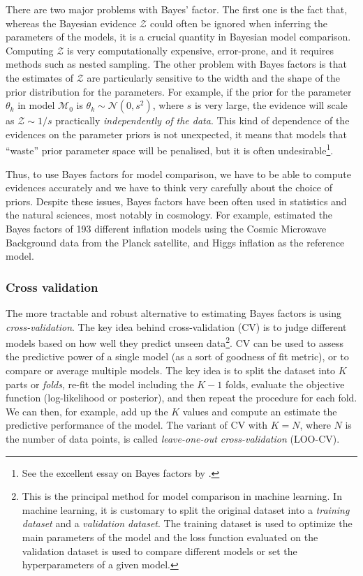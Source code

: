 \documentclass[12pt,dvipsnames]{report}
\begin{document}
There are two major problems with Bayes' factor. The first one is the fact that,
whereas the Bayesian evidence $\mathcal{Z}$ could often be ignored when inferring the 
parameters of the models, it is a crucial quantity in Bayesian model comparison. 
Computing $\mathcal{Z}$ is very computationally expensive, error-prone, and it
 requires methods such as nested sampling.
The other problem with Bayes
factors is that the estimates of $\mathcal{Z}$ are particularly sensitive to the 
width and the shape of the prior distribution for the parameters. For example, if 
the prior for the parameter $\theta_k$
in model $\mathcal{M}_0$ is $\theta_k\sim \mathcal{N}(0, s^2)$, where $s$ is
very large, the evidence will scale as $\mathcal{Z}\sim 1/s$ practically
\emph{independently of the data}. This kind of dependence of the evidences on the
parameter priors is not unexpected, it means that models that ``waste'' prior
parameter space will be penalised, but it is often undesirable\footnote{See the 
excellent essay on Bayes factors by \citet{navarro_2020}.}. 

Thus, to use Bayes factors for model comparison, we have to be able to
compute evidences accurately and we have to think very carefully about the choice of 
priors. Despite
these issues, Bayes factors have been often used in statistics and the 
natural sciences, most notably in cosmology. For example, \citet{arXiv:1312.3529} 
estimated the Bayes factors of 193 different 
inflation models using the Cosmic Microwave Background
data from the Planck satellite, and Higgs inflation as the reference model. 

\subsubsection{Cross validation}
The more tractable and robust alternative to estimating Bayes factors is using 
\emph{cross-validation}. The key idea behind cross-validation (CV) is to judge 
different models based on how well they predict unseen data\footnote{This is 
the principal method for model comparison in machine learning. In machine learning, 
it is customary to split the original dataset into a \emph{training dataset} 
and a \emph{validation dataset}. The training dataset is used to optimize 
the main parameters of the model and the loss function evaluated on the 
validation dataset is used to compare different models or set the hyperparameters
of a given model.}. 
CV can be used to assess the predictive power of a single model (as a sort of 
goodness of fit metric), or to compare or average multiple models. 
The key idea is to split the dataset into $K$ parts or \emph{folds}, 
re-fit the model including the $K-1$ folds, evaluate the objective function 
(log-likelihood or posterior), and then repeat the procedure for each fold. We 
can then, for example, add up the $K$ values and compute an estimate 
the predictive performance of the model. 
The variant of CV with $K=N$, where $N$ is the number of data points, is called
\emph{leave-one-out cross-validation} (LOO-CV).
\end{document}
